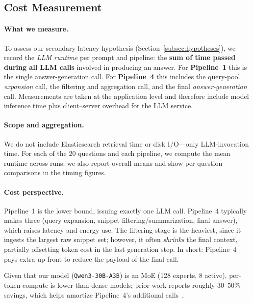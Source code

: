 \documentclass[manuscript,screen]{acmart}
\begin{document}
\begin{CCSXML}
		
	\subsection{Cost Measurement}
	\label{subsec:cost-measure}

	\paragraph{What we measure.}
	To assess our secondary latency hypothesis (Section~\ref{subsec:hypotheses}), we record the
	\emph{LLM runtime} per prompt and pipeline: the \textbf{sum of time passed during all LLM
		calls} involved in producing an answer. For \textbf{Pipeline~1} this is the single
	answer-generation call. For \textbf{Pipeline~4} this includes the query-pool \emph{expansion}
	call, the filtering and aggregation call, and the final \emph{answer-generation} call. Measurements are taken at the application level and
	therefore include model inference time plus client–server overhead for the LLM service.
	
	\paragraph{Scope and aggregation.}
	We do not include Elasticsearch retrieval time or disk I/O—only LLM-invocation time. For each
	of the 20 questions and each pipeline, we compute the mean runtime across runs; we also report
	overall means and show per-question comparisons in the timing figures.
	
	\paragraph{Cost perspective.}
	\label{cost-perspective}
	Pipeline~1 is the lower bound, issuing exactly one LLM call. Pipeline~4 typically makes three (query expansion, snippet filtering/summarization, final answer), which raises latency and energy use. The filtering stage is the heaviest, since it ingests the largest raw snippet set; however, it often \emph{shrinks} the final context, partially offsetting token cost in the last generation step. In short: Pipeline~4 pays extra up front to reduce the payload of the final call.
	
	Given that our model (\texttt{Qwen3-30B-A3B}) is an MoE (128 experts, 8 active), per-token compute is lower than dense models; prior work reports roughly 30–50\% savings, which helps amortize Pipeline~4’s additional calls~\cite{qwen3_model,yun2024inferenceoptimalmixtureofexpertlargelanguage}.


\end{CCSXML}
\end{document}
